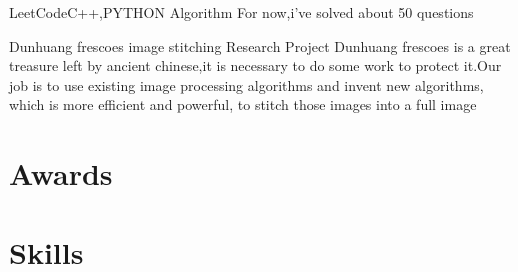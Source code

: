 \documentclass[11pt,a4paper]{moderncv}
\begin{document}
\vspace*{0.2\baselineskip}
{LeetCode}{C++,PYTHON}
{Algorithm}{}
{For now,i've solved about 50 questions}

\vspace*{0.2\baselineskip}
{Dunhuang frescoes image stitching}{}
{Research Project}{}
{Dunhuang frescoes is a great treasure left by ancient chinese,it is necessary to do some work to protect it.Our job is to use existing image processing algorithms and invent new algorithms, which is more efficient and powerful, to stitch those images into a full image}





\section{Awards}

\section{Skills}
\end{document}

